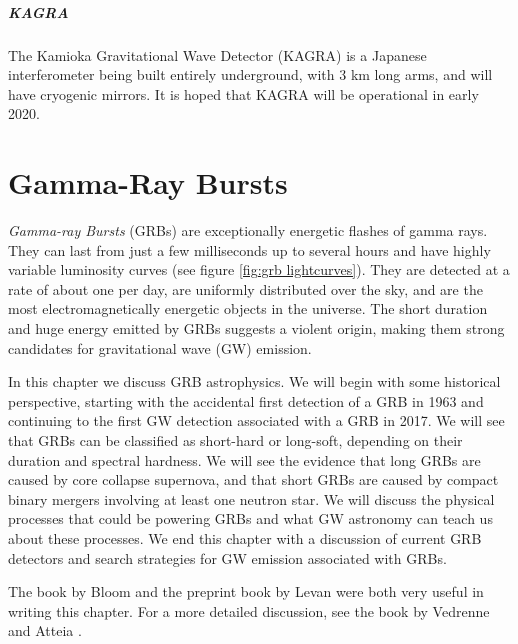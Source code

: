 \documentclass[11pt]{cuthesis}
\begin{document}
\paragraph{KAGRA}
The Kamioka Gravitational Wave Detector (KAGRA) is a Japanese interferometer being built entirely underground, with 3 km long arms, and will have cryogenic mirrors. It is hoped that KAGRA will be operational in early 2020.





\chapter{Gamma-Ray Bursts} \label{chap:GRBs}
\textit{Gamma-ray Bursts} (GRBs) are exceptionally energetic flashes of gamma rays. They can last from just a few milliseconds up to several hours and have highly variable luminosity curves (see figure \ref{fig:grb lightcurves}). They are detected at a rate of about one per day, are uniformly distributed over the sky, and are the most electromagnetically energetic objects in the universe. The short duration and huge energy emitted by GRBs suggests a violent origin, making them strong candidates for gravitational wave (GW) emission.

In this chapter we discuss GRB astrophysics. We will begin with some historical perspective, starting with the accidental first detection of a GRB in 1963 and continuing to the first GW detection associated with a GRB in 2017. We will see that GRBs can be classified as short-hard or long-soft, depending on their duration and spectral hardness. We will see the evidence that long GRBs are caused by core collapse supernova, and that short GRBs are caused by compact binary mergers involving at least one neutron star. We will discuss the physical processes that could be powering GRBs and what GW astronomy can teach us about these processes. We end this chapter with a discussion of current GRB detectors and search strategies for GW emission associated with GRBs.

The book by Bloom \cite{bloom_grbs} and the preprint book by Levan \cite{levan_grbs} were both very useful in writing this chapter. For a more detailed discussion, see the book by Vedrenne and Atteia \cite{vedrenne_gamma-ray}.
\end{document}
